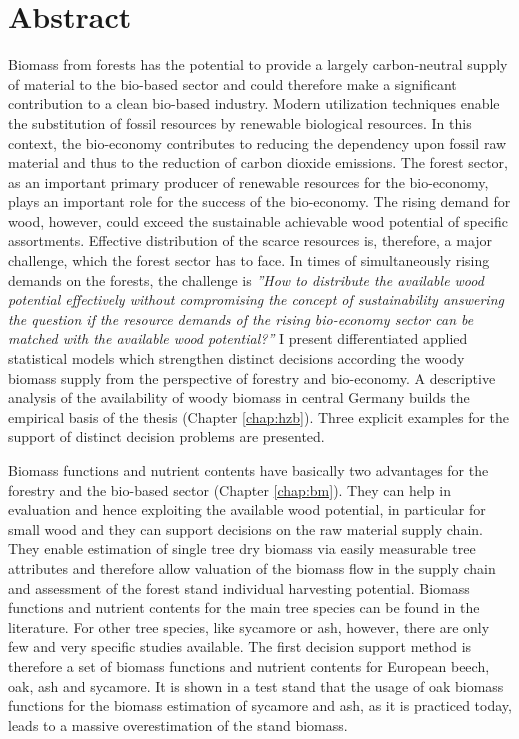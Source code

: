 \chapter*{Abstract}
\label{chap:Summary}
Biomass from forests has the potential to provide a largely carbon-neutral supply of material to the bio-based sector and could therefore make a significant contribution to a clean bio-based industry. Modern utilization techniques enable the substitution of fossil resources by renewable biological resources. In this context, the bio-economy contributes to reducing the dependency upon fossil raw material and thus to the reduction of carbon dioxide emissions. The forest sector, as an important primary producer of renewable resources for the bio-economy, plays an important role for the success of the bio-economy. The rising demand for wood, however, could exceed the sustainable achievable wood potential of specific assortments. Effective distribution of the scarce resources is, therefore, a major challenge, which the forest sector has to face. In times of simultaneously rising demands on the forests, the challenge is \textit{''How to distribute the available wood potential effectively without compromising the concept of sustainability answering the question if the resource demands of the rising bio-economy sector can be matched with the available wood potential?''} I present differentiated applied statistical models which strengthen distinct decisions according the woody biomass supply from the perspective of forestry and bio-economy. A descriptive analysis of the availability of woody biomass in central Germany builds the empirical basis of the thesis (Chapter \ref{chap:hzb}). Three explicit examples for the support of distinct decision problems are presented.

Biomass functions and nutrient contents have basically two advantages for the forestry and the bio-based sector (Chapter \ref{chap:bm}). They can help in evaluation and hence exploiting the available wood potential, in particular for small wood and they can support decisions on the raw material supply chain. They enable estimation of single tree dry biomass via easily measurable tree attributes and therefore allow valuation of the biomass flow in the supply chain and assessment of the forest stand individual harvesting potential. Biomass functions and nutrient contents for the main tree species can be found in the literature. For other tree species, like sycamore or ash, however, there are only few and very specific studies available. The first decision support method is therefore a set of biomass functions and nutrient contents for European beech, oak, ash and sycamore. It is shown in a test stand that the usage of oak biomass functions for the biomass estimation of sycamore and ash, as it is practiced today, leads to a massive overestimation of the stand biomass.


